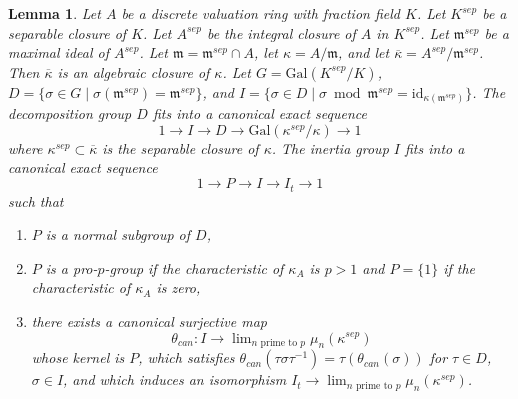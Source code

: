 \documentclass{stacks-project}
\theoremstyle{plain}
\newtheorem{lemma}[subsection]{Lemma}
\theoremstyle{definition}
\theoremstyle{remark}
\numberwithin{equation}{subsection}
\def\lim{\mathop{\mathrm{lim}}\nolimits}
\begin{document}
\begin{lemma}
\label{lemma-structure-decomposition-separable-closure}
Let $A$ be a discrete valuation ring with fraction field $K$.
Let $K^{sep}$ be a separable closure of $K$.
Let $A^{sep}$ be the integral closure of $A$ in $K^{sep}$.
Let $\mathfrak m^{sep}$ be a maximal ideal of $A^{sep}$.
Let $\mathfrak m = \mathfrak m^{sep} \cap A$, let
$\kappa = A/\mathfrak m$, and let
$\overline{\kappa} = A^{sep}/\mathfrak m^{sep}$.
Then $\overline{\kappa}$ is an algebraic closure of $\kappa$.
Let $G = \text{Gal}(K^{sep}/K)$,
$D = \{\sigma \in G \mid \sigma(\mathfrak m^{sep}) = \mathfrak m^{sep}\}$, and
$I = \{\sigma \in D \mid \sigma \bmod \mathfrak m^{sep} =
\text{id}_{\kappa(\mathfrak m^{sep})}\}$.
The decomposition group $D$ fits into a canonical exact sequence
$$
1 \to I \to D \to \text{Gal}(\kappa^{sep}/\kappa) \to 1
$$
where $\kappa^{sep} \subset \overline{\kappa}$ is the separable
closure of $\kappa$.
The inertia group $I$ fits into a canonical exact sequence
$$
1 \to P \to I \to I_t \to 1
$$
such that
\begin{enumerate}
\item $P$ is a normal subgroup of $D$,
\item $P$ is a pro-$p$-group if the characteristic of
$\kappa_A$ is $p > 1$ and $P = \{1\}$ if the characteristic of $\kappa_A$
is zero,
\item there exists a canonical surjective map
$$
\theta_{can} : I \to \lim_{n\text{ prime to }p} \mu_n(\kappa^{sep})
$$
whose kernel is $P$, which satisfies
$\theta_{can}(\tau \sigma \tau^{-1}) = \tau(\theta_{can}(\sigma))$
for $\tau \in D$, $\sigma \in I$, and which induces an isomorphism
$I_t \to \lim_{n\text{ prime to }p} \mu_n(\kappa^{sep})$.
\end{enumerate}
\end{lemma}
\end{document}
